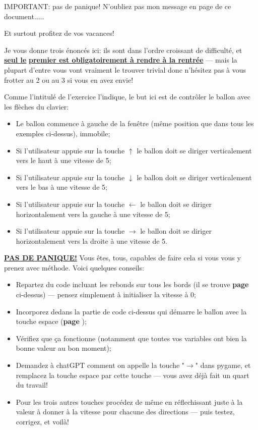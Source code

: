 \documentclass[11pt]{article}
\begin{document}
	\begin{MonAlarme}{IMPORTANT: pas de panique!}
		N'oubliez pas mon message en page \pageref{ToutVaBien} de ce document.....
		
		Et surtout profitez de vos vacances!
	\end{MonAlarme}
	
	Je vous donne trois énoncés ici: ils sont dans l'ordre croissant de difficulté, et \uline{\textbf{seul le}} \uline{\textbf{premier est obligatoirement à rendre à la rentrée}} --- mais la plupart d'entre vous vont vraiment le trouver trivial donc n'hésitez pas à vous frotter au 2 ou au 3 si vous en avez envie!
	
	\begin{MonExo}
		Comme l'intitulé de l'exercice l'indique, le but ici est de contrôler le ballon avec les flèches du clavier:
		\begin{itemize}
			\item Le ballon commence à gauche de la fenêtre (même position que dans tous les exemples ci-dessus), immobile;
			\item Si l'utilisateur appuie sur la touche $\uparrow$ le ballon doit se diriger verticalement vers le haut à une vitesse de 5;
			\item Si l'utilisateur appuie sur la touche $\downarrow$ le ballon doit se diriger verticalement vers le bas à une vitesse de 5;
			\item Si l'utilisateur appuie sur la touche $\leftarrow$ le ballon doit se diriger horizontalement vers la gauche à une vitesse de 5;
			\item Si l'utilisateur appuie sur la touche $\rightarrow$ le ballon doit se diriger horizontalement vers la droite à une vitesse de 5.
		\end{itemize}
		\uline{\textbf{PAS DE PANIQUE!}} Vous êtes, tous, capables de faire cela si vous vous y prenez avec méthode. Voici quelques conseils:
		\begin{itemize}
			\item Repartez du code incluant les rebonds sur tous les bords (il se trouve \textbf{page \pageref{RebondDiag}} ci-dessus) --- pensez simplement à initialiser la vitesse à 0;
			\item Incorporez dedans la partie de code ci-dessus qui démarre le ballon avec la touche espace (\textbf{page \pageref{DemarBall}});
			\item Vérifiez que ça fonctionne (notamment que toutes vos variables ont bien la bonne valeur au bon moment);
			\item Demandez à chatGPT comment on appelle la touche "$\rightarrow$" dans pygame, et remplacez la touche espace par cette touche --- vous avez déjà fait un quart du travail!
			\item Pour les trois autres touches procédez de même en réflechissant juste à la valeur à donner à la vitesse pour chacune des directions --- puis testez, corrigez, et voilà!
		\end{itemize}
	\end{MonExo}
	
\end{document}
